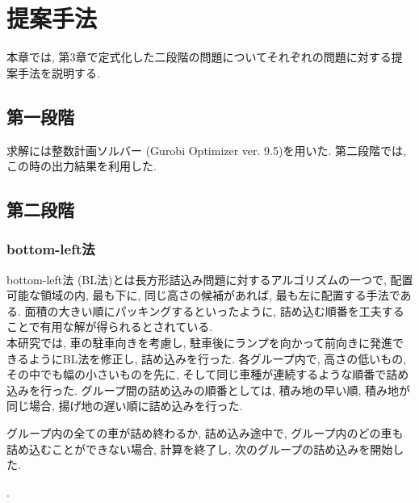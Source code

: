 \chapter{提案手法}\label{method}
本章では, 第3章で定式化した二段階の問題についてそれぞれの問題に対する提案手法を説明する. 

\section{第一段階}
求解には整数計画ソルバー (Gurobi Optimizer ver. 9.5)を用いた. 
第二段階では, この時の出力結果を利用した. 

\section{第二段階}
\subsection*{bottom-left法}
bottom-left法 (BL法)とは長方形詰込み問題に対するアルゴリズムの一つで, 配置可能な領域の内, 最も下に, 同じ高さの候補があれば, 最も左に配置する手法である\cite{nfp2}. 
面積の大きい順にパッキングするといったように, 詰め込む順番を工夫することで有用な解が得られるとされている. \\


本研究では, 車の駐車向きを考慮し, 駐車後にランプを向かって前向きに発進できるようにBL法を修正し, 詰め込みを行った. 
各グループ内で, 高さの低いもの, その中でも幅の小さいものを先に, そして同じ車種が連続するような順番で詰め込みを行った. 
グループ間の詰め込みの順番としては, 積み地の早い順, 積み地が同じ場合, 揚げ地の遅い順に詰め込みを行った. 

グループ内の全ての車が詰め終わるか, 詰め込み途中で, グループ内のどの車も詰め込むことができない場合, 計算を終了し, 次のグループの詰め込みを開始した.

. 